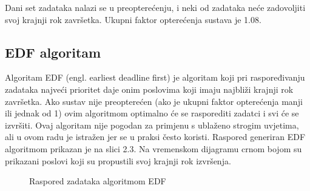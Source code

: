 \documentclass[../zavrsni.tex]{subfiles}
\begin{document}
Dani set zadataka nalazi se u preopterećenju, i neki od zadataka neće zadovoljiti svoj krajnji rok završetka. Ukupni faktor opterećenja
sustava je 1.08.

\subsection{EDF algoritam}

Algoritam EDF (engl. earliest deadline first) je algoritam koji pri raspoređivanju zadataka najveći prioritet daje onim poslovima 
koji imaju najbliži krajnji rok završetka. 
Ako sustav nije preopterećen (ako je ukupni faktor opterećenja manji ili jednak od 1) 
ovim algoritmom optimalno će se rasporediti zadatci i svi će se izvršiti. Ovaj algoritam nije pogodan za primjenu s ublaženo strogim uvjetima, 
ali u ovom radu je istražen jer se u praksi često koristi. 
Raspored generiran EDF algoritmom prikazan je na slici 2.3.
Na vremenskom dijagramu crnom bojom su prikazani poslovi koji su propustili svoj krajnji rok izvršenja.

\begin{figure}[h!]
    \centering

    \begin{RTGrid}[width=13cm]{3}{24}

  

  

  

    \end{RTGrid}

    \caption{Raspored zadataka algoritmom EDF}
    \label{fig:ex1}
  \end{figure}
\end{document}
